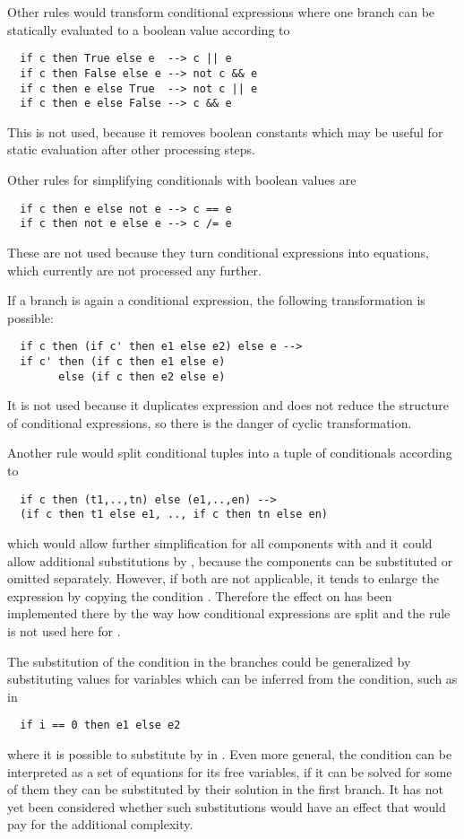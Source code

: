 Other rules would transform conditional expressions where one branch can be statically evaluated to a boolean value according to
\begin{verbatim}
  if c then True else e  --> c || e
  if c then False else e --> not c && e
  if c then e else True  --> not c || e
  if c then e else False --> c && e
\end{verbatim}
This is not used, because it removes boolean constants which may be useful for static evaluation after other processing steps.

Other rules for simplifying conditionals with boolean values are
\begin{verbatim}
  if c then e else not e --> c == e
  if c then not e else e --> c /= e
\end{verbatim}
These are not used because they turn conditional expressions into equations, which currently are not processed any further.

If a branch is again a conditional expression, the following transformation is possible:
\begin{verbatim}
  if c then (if c' then e1 else e2) else e -->
  if c' then (if c then e1 else e)
        else (if c then e2 else e)
\end{verbatim}
It is not used because it duplicates expression  and does not reduce the structure of conditional expressions,
so there is the danger of cyclic transformation.

Another rule would split conditional tuples into a tuple of conditionals according to
\begin{verbatim}
  if c then (t1,..,tn) else (e1,..,en) --> 
  (if c then t1 else e1, .., if c then tn else en)
\end{verbatim}
which would allow further simplification for all components with  and it could allow additional substitutions
by , because the components can be substituted or omitted separately. However, if both are not applicable, it 
tends to enlarge the expression by copying the condition . Therefore the effect on  has been implemented
there by the way how conditional expressions are split and the rule is not used here for .

The substitution of the condition in the branches could be generalized by substituting values for variables which can be
inferred from the condition, such as in
\begin{verbatim}
  if i == 0 then e1 else e2
\end{verbatim}
where it is possible to substitute  by  in . Even more general, the condition can be interpreted as
a set of equations for its free variables, if it can be solved for some of them they can be substituted by their solution
in the first branch. It has not yet been considered whether such substitutions would have an effect that would pay for the 
additional complexity.

